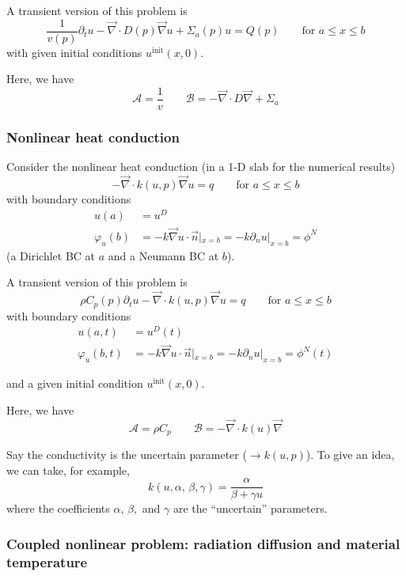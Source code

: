 \documentclass[11pt]{article}
\renewcommand{\div}{\vec{\nabla}\! \cdot \!}
\newcommand{\grad}{\vec{\nabla}}
\newcommand{\be}{\begin{equation}}
\newcommand{\ee}{\end{equation}}
\renewcommand{\O}{\mathcal{O}}
\newcommand{\mc}[1]{\mathcal{#1}}
\begin{document}
A transient version of this problem is
\be
\frac{1}{v(p)} \partial_t u -\div D(p) \grad u  + \Sigma_a(p) u = Q(p) \qquad \text{for } a \le x \le b
\ee
with given initial conditions $u^{\text{init}}(x,0)$.

Here, we have
\be 
\mc{A} = \frac{1}{v} \qquad  \mc{B} =  -\div D \grad   + \Sigma_a 
\ee

\subsubsection{Nonlinear heat conduction}

Consider the nonlinear heat conduction (in a 1-D slab for the numerical results)
\be
-\div k(u,p)  \grad u = q \qquad \text{for } a \le x \le b
\label{eq:heat_conduction}
\ee
with boundary conditions
\begin{align}
u(a) &= u^D \\
\varphi_u(b) &=  -k \grad u \cdot \vec{n} |_{x=b}= -k \partial_n u |_{x=b} = \phi^N
\end{align}
(a Dirichlet BC at $a$ and a Neumann BC at $b$).

A transient version of this problem is
\be
\rho C_p(p) \partial_t u -\div k(u,p)  \grad u = q \qquad \text{for } a \le x \le b
\label{eq:heat_conduction_transient}
\ee
with boundary conditions
\begin{align}
u(a,t) &= u^D(t) \\
\varphi_u(b,t) &=  -k \grad u \cdot \vec{n} |_{x=b}= -k \partial_n u |_{x=b} = \phi^N(t)
\end{align}

and a given initial condition $u^{\text{init}}(x,0)$.

Here, we have
\be 
\mc{A} = \rho C_p \qquad  \mc{B} =  -\div k(u)  \grad
\ee

Say the conductivity is the uncertain parameter ($\longrightarrow k(u,p)$). 
To give an idea, we can take, for example, 
\be
k(u,\alpha,\,\beta,\gamma) = \frac{\alpha}{\beta + \gamma u}
\ee
where the coefficients $\alpha,\,\beta,$ and $\gamma$ are the ``uncertain'' parameters.



\subsubsection{Coupled nonlinear problem: radiation diffusion and material temperature}
\end{document}
